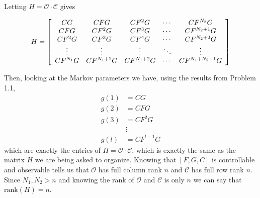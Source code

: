 \documentclass{report} %
\begin{document}
\begin{spacing}{1.1}
\begin{homeworkProblem}
\begin{homeworkSection}{1.2}
{Letting $H=\mathcal{O}\cdot\mathcal{C}$ gives

\begin{equation*}
H = \left[\begin{array}{c c c c c}
CG & CFG & CF^2G & \cdots & CF^{N_2}G \\
CFG & CF^2G & CF^3G & \cdots & CF^{N_2+1}G \\
CF^2G & CF^3G & CF^4G & \cdots & CF^{N_2+2}G \\
\vdots & \vdots & \vdots & \ddots & \vdots \\
CF^{N_1}G & CF^{N_1+1}G & CF^{N_1+2}G & \cdots & CF^{N_1+N_2-1}G
\end{array}\right]
\end{equation*}

Then, looking at the Markov parameters we have, using the results from Problem 1.1,
\begin{align*}
g(1) &= CG \\
g(2) &= CFG \\
g(3) &= CF^2G \\
&\vdots \\
g(l) &= CF^{l-1}G
\end{align*}
which are exactly the entries of $H=\mathcal{O}\cdot\mathcal{C}$, which is exactly the same as the matrix $H$ we are being asked to organize. Knowing that $[F,G,C]$ is controllable and observable tells us that $\mathcal{O}$ has full column rank $n$ and $\mathcal{C}$ has full row rank $n$. Since $N_1,N_2>n$ and knowing the rank of $\mathcal{O}$ and $\mathcal{C}$ is only $n$ we can say that $\text{rank}(H)=n$.
}
\end{homeworkSection}
\end{homeworkProblem}

\end{spacing}
% 
% 
\end{document}
